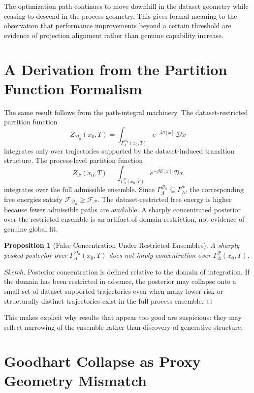 \documentclass[12pt]{article}
\theoremstyle{plain}
\newtheorem{proposition}[theorem]{Proposition}
\theoremstyle{definition}
\theoremstyle{remark}
\begin{document}
The optimization path continues to move downhill in the dataset geometry while ceasing to descend in the process geometry. This gives formal meaning to the observation that performance improvements beyond a certain threshold are evidence of projection alignment rather than genuine capability increase.

\section{A Derivation from the Partition Function Formalism}

The same result follows from the path-integral machinery. The dataset-restricted partition function
\[
Z_{\mathcal{D}_n}(x_0,T) = \int_{\Gamma_{\Lambda}^{\mathcal{D}_n}(x_0,T)} e^{-\beta \mathcal{S}[x]} \,\mathcal{D}x
\]
integrates only over trajectories supported by the dataset-induced transition structure. The process-level partition function
\[
Z_{\mathcal{P}}(x_0,T) = \int_{\Gamma_{\Lambda}^{\mathcal{P}}(x_0,T)} e^{-\beta \mathcal{S}[x]} \,\mathcal{D}x
\]
integrates over the full admissible ensemble. Since $\Gamma_{\Lambda}^{\mathcal{D}_n} \subsetneq \Gamma_{\Lambda}^{\mathcal{P}}$, the corresponding free energies satisfy $\mathcal{F}_{\mathcal{D}_n} \ge \mathcal{F}_{\mathcal{P}}$. The dataset-restricted free energy is higher because fewer admissible paths are available. A sharply concentrated posterior over the restricted ensemble is an artifact of domain restriction, not evidence of genuine global fit.

\begin{proposition}[False Concentration Under Restricted Ensembles]
A sharply peaked posterior over $\Gamma_{\Lambda}^{\mathcal{D}_n}(x_0,T)$ does not imply concentration over $\Gamma_{\Lambda}^{\mathcal{P}}(x_0,T)$.
\end{proposition}

\begin{proof}[Sketch]
Posterior concentration is defined relative to the domain of integration. If the domain has been restricted in advance, the posterior may collapse onto a small set of dataset-supported trajectories even when many lower-risk or structurally distinct trajectories exist in the full process ensemble.
\end{proof}

This makes explicit why results that appear too good are suspicious: they may reflect narrowing of the ensemble rather than discovery of generative structure.

\section{Goodhart Collapse as Proxy Geometry Mismatch}
\end{document}
